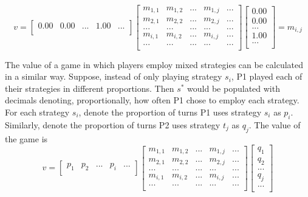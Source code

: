 \documentclass[11pt]{article}
\begin{document}
\begin{equation*}
v = \left[ {\begin{array}{ccccc}
0.00 & 0.00 & ... & 1.00 & ... \\
\end{array} } \right]
\left[ {\begin{array}{ccccc}
m_{1,1} & m_{1,2}   & ... & m_{1,j} & ... \\
m_{2,1} & m_{2,2}   & ... & m_{2,j} & ... \\
...    & ...      & ... & ...    & ... \\
m_{i,1} & m_{i,2}   & ... & m_{i,j} & ... \\
...    & ...      & ... & ...    & ... \\
\end{array} } \right]
\left[ {\begin{array}{c}
0.00 \\
0.00 \\
... \\
1.00 \\
... \\
\end{array} } \right] = m_{i,j}
\end{equation*}

The value of a game in which players employ mixed strategies can be
calculated in a similar way. Suppose, instead of only playing strategy
$s_i$, P1 played each of their strategies in different
proportions. Then $s^*$ would be populated with decimals denoting,
proportionally, how often P1 chose to employ each strategy. For each
strategy $s_i$, denote the proportion of turns P1 uses strategy $s_i$
as $p_i$. Similarly, denote the proportion of turns P2 uses strategy
$t_j$ as $q_j$. The value of the game is
\begin{equation*}
v = \left[ {\begin{array}{ccccc}
p_1 & p_2 & ... & p_i & ... \\
\end{array} } \right]
\left[ {\begin{array}{ccccc}
m_{1,1} & m_{1,2}   & ... & m_{1,j} & ... \\
m_{2,1} & m_{2,2}   & ... & m_{2,j} & ... \\
...    & ...      & ... & ...    & ... \\
m_{i,1} & m_{i,2}   & ... & m_{i,j} & ... \\
...    & ...      & ... & ...    & ... \\
\end{array} } \right]
\left[ {\begin{array}{c}
q_1 \\
q_2 \\
... \\
q_j \\
... \\
\end{array} } \right]
\end{equation*}
\end{document}
